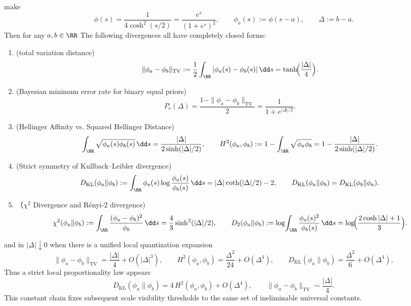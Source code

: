 \begin{proposition}\label{prop:xi-logistic-divergence-dictionary}
make
\[
\phi(s)=\frac{1}{4\cosh^{2}(s/2)}=\frac{e^{s}}{(1+e^{s})^{2}},
\qquad
\phi_a(s):=\phi(s-a),
\qquad
\Delta:=b-a.
\]
Then for any \(a,b\in\RR\) The following divergences all have completely closed forms:
\begin{enumerate}
  \item \textup{(total variation distance)}
  \[
  \|\phi_a-\phi_b\|_{\mathrm{TV}}
  :=\frac12\int_{\RR}|\phi_a(s)-\phi_b(s)|\,\dd s
  =\tanh\!\Bigl(\frac{|\Delta|}{4}\Bigr).
  \]
  \item \textup{(Bayesian minimum error rate for binary equal priors)}
  \[
  P_{\mathrm e}(\Delta)
  =\frac{1-\|\phi_a-\phi_b\|_{\mathrm{TV}}}{2}
  =\frac{1}{1+e^{|\Delta|/2}}.
  \]
  \item \textup{(Hellinger Affinity vs. Squared Hellinger Distance)}
  \[
  \int_{\RR}\sqrt{\phi_a(s)\phi_b(s)}\,\dd s
  =\frac{|\Delta|}{2\sinh(|\Delta|/2)},
  \qquad
  H^{2}(\phi_a,\phi_b)
  :=1-\int_{\RR}\sqrt{\phi_a\phi_b}
  =1-\frac{|\Delta|}{2\sinh(|\Delta|/2)}.
  \]
  \item \textup{(Strict symmetry of Kullback--Leibler divergence)}
  \[
  D_{\mathrm{KL}}(\phi_a\|\phi_b)
  :=\int_{\RR}\phi_a(s)\log\frac{\phi_a(s)}{\phi_b(s)}\,\dd s
  =|\Delta|\coth(|\Delta|/2)-2,
  \qquad
  D_{\mathrm{KL}}(\phi_a\|\phi_b)=D_{\mathrm{KL}}(\phi_b\|\phi_a).
  \]
  \item \textup{（\(\chi^2\) Divergence and Rényi-\(2\) divergence)}
  \[
  \chi^2(\phi_a\|\phi_b)
  :=\int_{\RR}\frac{(\phi_a-\phi_b)^2}{\phi_b}\,\dd s
  =\frac{4}{3}\sinh^{2}(|\Delta|/2),
  \qquad
  D_2(\phi_a\|\phi_b)
  :=\log\!\int_{\RR}\frac{\phi_a(s)^2}{\phi_b(s)}\,\dd s
  =\log\!\Bigl(\frac{2\cosh|\Delta|+1}{3}\Bigr).
  \]
\end{enumerate}
and in \(|\Delta|\downarrow 0\) when there is a unified local quantization expansion
\[
\|\phi_a-\phi_b\|_{\mathrm{TV}}=\frac{|\Delta|}{4}+O(|\Delta|^{3}),
\qquad
H^{2}(\phi_a,\phi_b)=\frac{\Delta^{2}}{24}+O(\Delta^{4}),
\qquad
D_{\mathrm{KL}}(\phi_a\|\phi_b)=\frac{\Delta^{2}}{6}+O(\Delta^{4}),
\]
Thus a strict local proportionality law appears
\[
D_{\mathrm{KL}}(\phi_a\|\phi_b)=4\,H^{2}(\phi_a,\phi_b)+O(\Delta^{4}),
\qquad
\|\phi_a-\phi_b\|_{\mathrm{TV}}\sim\frac{|\Delta|}{4}.
\]
This constant chain fixes subsequent scale visibility thresholds to the same set of ineliminable universal constants.
\end{proposition}
